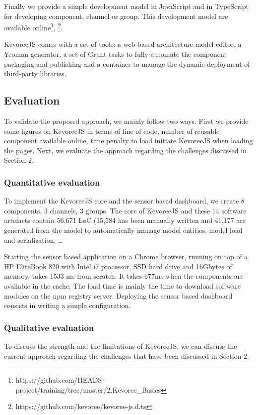 Finally we provide a simple development model in JavaScript and in TypeScript for developing component, channel or  group. This development model are available online\footnote{ https://github.com/HEADS-project/training/tree/master/2.Kevoree\_Basics}, \footnote{https://github.com/kevoree/kevoree-js.d.ts }.  

KevoreeJS comes with a set of tools: a web-based architecture model editor, a Yeoman generator, a set of Grunt tasks to fully automate the component packaging and publishing and a container to manage the dynamic deployment of third-party libraries. 

\subsection{Evaluation} 
To validate the proposed approach, we mainly follow two ways. First we provide some figures on KevoreeJS in terms of line of code, number of reusable component available online, time penalty to load initiate KevoreeJS when loading the pages. Next, we evaluate the approach regarding the challenges discussed in Section 2. 

\subsubsection{Quantitative evaluation}
To implement the KevoreeJS core and the sensor based dashboard, we create 8 components, 3 channels, 3 groups. The core of KevoreeJS and these 14 software artefacts contain 56,671 LoC (15,584 has been manually written and 41,177 are generated from the model to automatically manage model entities, model load and serialization, \dots

Starting the sensor based application on a Chrome browser, running on top of a HP EliteBook 820 with Intel i7 processor, SSD hard drive and 16Gbytes of memory, takes 1533 ms from scratch. It takes 677ms when the components are available in the cache. The load time is mainly the time to download software modules on the npm registry server. Deploying the sensor based dashboard consists in writing a simple configuration.    


\subsubsection{Qualitative evaluation  }
To discuss the strength and the limitations of KevoreeJS, we can discuss the current approach regarding the challenges that have been discussed in Section 2.   

